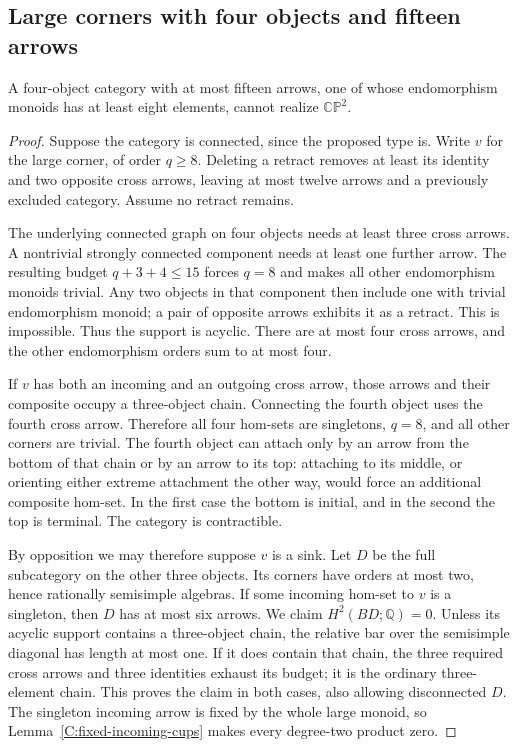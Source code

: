 \subsection{Large corners with four objects and fifteen arrows}

\begin{proposition}\label{C:fifteen-four-large-corner}
A four-object category with at most fifteen arrows, one of whose
endomorphism monoids has at least eight elements, cannot realize
$\mathbb{CP}^2$.
\end{proposition}
\begin{proof}
Suppose the category is connected, since the proposed type is.
Write $v$ for the large corner, of order $q\geq8$.
Deleting a retract removes at least its identity and two opposite
cross arrows, leaving at most twelve arrows and a previously
excluded category.  Assume no retract remains.

The underlying connected graph on four objects needs at least
three cross arrows.  A nontrivial strongly connected component
needs at least one further arrow.  The resulting budget
$q+3+4\leq15$ forces $q=8$ and makes all other endomorphism
monoids trivial.  Any two objects in that component then include
one with trivial endomorphism monoid; a pair of opposite arrows
exhibits it as a retract.  This is impossible.  Thus the support
is acyclic.  There are at most four cross arrows, and the other
endomorphism orders sum to at most four.

If $v$ has both an incoming and an outgoing cross arrow, those
arrows and their composite occupy a three-object chain.  Connecting
the fourth object uses the fourth cross arrow.  Therefore all
four hom-sets are singletons, $q=8$, and all other corners are
trivial.  The fourth object can attach only by an arrow from the
bottom of that chain or by an arrow to its top: attaching to its
middle, or orienting either extreme attachment the other way,
would force an additional composite hom-set.  In the first case
the bottom is initial, and in the second the top is terminal.
The category is contractible.

By opposition we may therefore suppose $v$ is a sink.  Let $D$
be the full subcategory on the other three objects.  Its corners
have orders at most two, hence rationally semisimple algebras.
If some incoming hom-set to $v$ is a singleton, then $D$ has at
most six arrows.  We claim $H^2(BD;\mathbb Q)=0$.
Unless its acyclic support contains a three-object chain, the
relative bar over the semisimple diagonal has length at most one.
If it does contain that chain, the three required cross arrows
and three identities exhaust its budget; it is the ordinary
three-element chain.  This proves the claim in both cases,
also allowing disconnected $D$.
The singleton incoming arrow is fixed by the whole large monoid,
so Lemma~\ref{C:fixed-incoming-cups} makes every degree-two
product zero.


\end{proof}
